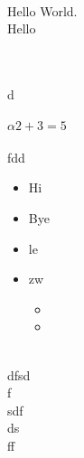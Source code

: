 \documentclass{article}
\begin{document}
\\
Hello World.\\
Hello\\
\\
\begin{comment}
 And so is this one
...

\end{comment}\\
d\\
\\
  $\alpha 2+3=5$\\
\\
fdd\\

\begin{itemize}
\item  Hi
\item  Bye
\item  le
\item  zw
\begin{itemize}
\item 
\item 

\end{itemize}
\end{itemize}\\
dfsd\\
f\\
sdf\\
ds\\
ff\\
\end{document}
